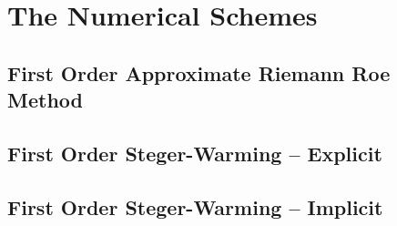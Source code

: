 \documentclass[11pt, a4paper]{article}
\begin{document}
\section{The Numerical Schemes}

\subsection{First Order Approximate Riemann Roe Method}

\subsection{First Order Steger-Warming -- Explicit}

\subsection{First Order Steger-Warming -- Implicit}
\end{document}
